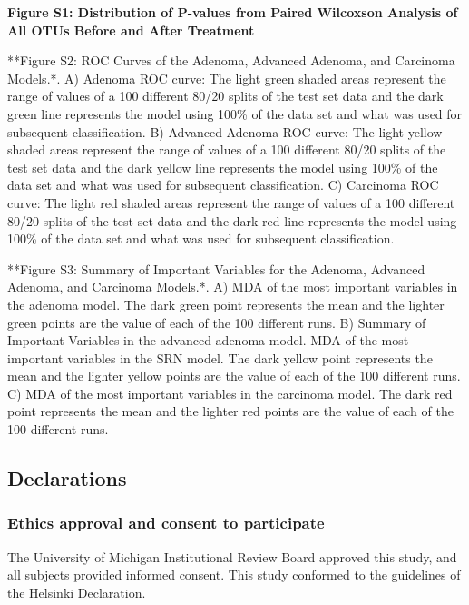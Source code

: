 \documentclass[12pt,]{article}
\begin{document}
\newpage

\textbf{Figure S1: Distribution of P-values from Paired Wilcoxson
Analysis of All OTUs Before and After Treatment}

**Figure S2: ROC Curves of the Adenoma, Advanced Adenoma, and Carcinoma
Models.*. A) Adenoma ROC curve: The light green shaded areas represent
the range of values of a 100 different 80/20 splits of the test set data
and the dark green line represents the model using 100\% of the data set
and what was used for subsequent classification. B) Advanced Adenoma ROC
curve: The light yellow shaded areas represent the range of values of a
100 different 80/20 splits of the test set data and the dark yellow line
represents the model using 100\% of the data set and what was used for
subsequent classification. C) Carcinoma ROC curve: The light red shaded
areas represent the range of values of a 100 different 80/20 splits of
the test set data and the dark red line represents the model using 100\%
of the data set and what was used for subsequent classification.

**Figure S3: Summary of Important Variables for the Adenoma, Advanced
Adenoma, and Carcinoma Models.*. A) MDA of the most important variables
in the adenoma model. The dark green point represents the mean and the
lighter green points are the value of each of the 100 different runs. B)
Summary of Important Variables in the advanced adenoma model. MDA of the
most important variables in the SRN model. The dark yellow point
represents the mean and the lighter yellow points are the value of each
of the 100 different runs. C) MDA of the most important variables in the
carcinoma model. The dark red point represents the mean and the lighter
red points are the value of each of the 100 different runs.

\newpage

\subsection{Declarations}\label{declarations}

\subsubsection{Ethics approval and consent to
participate}\label{ethics-approval-and-consent-to-participate}

The University of Michigan Institutional Review Board approved this
study, and all subjects provided informed consent. This study conformed
to the guidelines of the Helsinki Declaration.
\end{document}
